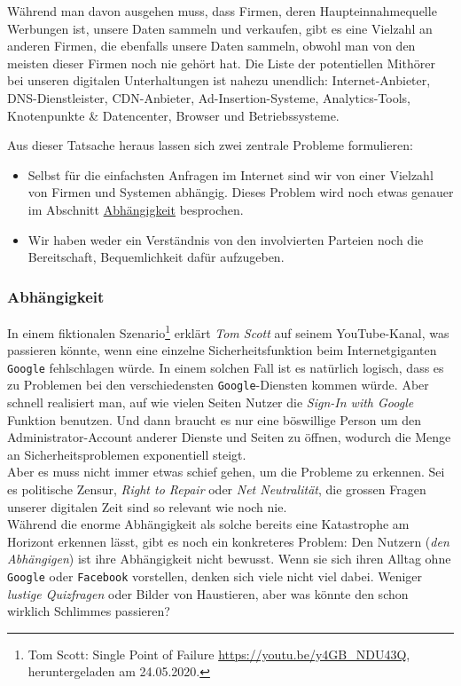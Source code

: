 \documentclass[11pt]{article}
\begin{document}
\noindent Während man davon ausgehen muss, dass Firmen, deren
Haupteinnahmequelle Werbungen ist, unsere Daten sammeln und verkaufen,
gibt es eine Vielzahl an anderen Firmen, die ebenfalls unsere Daten
sammeln, obwohl man von den meisten dieser Firmen noch nie gehört hat.
Die Liste der potentiellen Mithörer bei unseren digitalen
Unterhaltungen ist nahezu unendlich: Internet-Anbieter,
DNS-Dienstleister, CDN-Anbieter, Ad-Insertion-Systeme,
Analytics-Tools, Knotenpunkte \& Datencenter, Browser und
Betriebssysteme.

\noindent Aus dieser Tatsache heraus lassen sich zwei zentrale
Probleme formulieren:
\begin{itemize}
\item Selbst für die einfachsten Anfragen im Internet sind wir von einer
Vielzahl von Firmen und Systemen abhängig. Dieses Problem wird noch
etwas genauer im Abschnitt \hyperref[sec:org1e45f17]{Abhängigkeit} besprochen.
\item Wir haben weder ein Verständnis von den involvierten Parteien noch
die Bereitschaft, Bequemlichkeit dafür aufzugeben.
\end{itemize}
\subsubsection{Abhängigkeit}
\label{sec:org1e45f17}
In einem fiktionalen Szenario\footnote{Tom Scott: Single Point of Failure
\url{https://youtu.be/y4GB\_NDU43Q}, heruntergeladen am 24.05.2020.} erklärt \emph{Tom Scott} auf seinem
YouTube-Kanal, was passieren könnte, wenn eine einzelne
Sicherheitsfunktion beim Internetgiganten \texttt{Google} fehlschlagen würde.
In einem solchen Fall ist es natürlich logisch, dass es zu Problemen
bei den verschiedensten \texttt{Google}-Diensten kommen würde. Aber schnell
realisiert man, auf wie vielen Seiten Nutzer die \emph{Sign-In with Google}
Funktion benutzen. Und dann braucht es nur eine böswillige Person um
den Administrator-Account anderer Dienste und Seiten zu öffnen,
wodurch die Menge an Sicherheitsproblemen exponentiell steigt.\\

\noindent Aber es muss nicht immer etwas schief gehen, um die Probleme
zu erkennen. Sei es politische Zensur, \emph{Right to Repair} oder \emph{Net
Neutralität}, die grossen Fragen unserer digitalen Zeit sind so
relevant wie noch nie.\\

\noindent Während die enorme Abhängigkeit als solche bereits eine
Katastrophe am Horizont erkennen lässt, gibt es noch ein konkreteres
Problem: Den Nutzern (\emph{den Abhängigen}) ist ihre Abhängigkeit nicht
bewusst. Wenn sie sich ihren Alltag ohne \texttt{Google} oder \texttt{Facebook}
vorstellen, denken sich viele nicht viel dabei. Weniger \emph{lustige
Quizfragen} oder Bilder von Haustieren, aber was könnte den schon
wirklich Schlimmes passieren?\\
\end{document}
